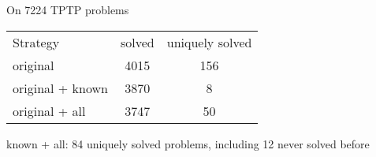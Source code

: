 \begin{frame}{On 7224 TPTP problems}
  \begin{center}
    {\footnotesize
      \begin{tabular}{lcc}
        \hline\noalign{\smallskip}
        Strategy & solved & uniquely solved \\
        \noalign{\smallskip}\hline\noalign{\smallskip}
        original & 4015 & 156 \\
        original + known & 3870 & 8 \\
        original + all & 3747 & 50 \\
        \hline
      \end{tabular}
    }
  \end{center}
  known + all: 84 uniquely solved problems, including 12 never solved
  before
\end{frame}
